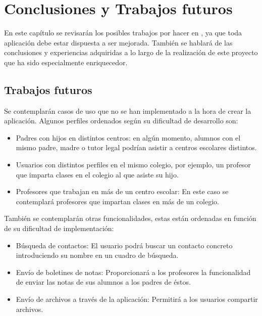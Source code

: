 %
%
%
%

\cleardoublepage
\chapter{Conclusiones y Trabajos futuros}
\label{chap:conclusions}

	En este capítulo se revisarán los posibles trabajos por hacer en \CollegeApp, ya que toda aplicación debe estar dispuesta a ser mejorada. También se hablará de las conclusiones y experiencias adquiridas a lo largo de la realización de este proyecto que ha sido especialmente enriquecedor.

	\section{Trabajos futuros}
	
		Se contemplarán casos de uso que no se han implementado a la hora de crear la aplicación. Algunos perfiles ordenados según su dificultad de desarrollo son:
		
		\begin{itemize}
			\item Padres con hijos en distintos centros: en algún momento, alumnos con el mismo padre, madre o tutor legal podrían asistir a centros escolares distintos.
			\item Usuarios con distintos perfiles en el mismo colegio, por ejemplo, un profesor que imparta clases en el colegio al que asiste su hijo.
			\item Profesores que trabajan en más de un centro escolar: En este caso se contemplará profesores que impartan clases en más de un colegio.
		\end{itemize}
		
		También se contemplarán otras funcionalidades, estas están ordenadas en función de su dificultad de implementación:
		\begin{itemize}
			\item Búsqueda de contactos: El usuario podrá buscar un contacto concreto introduciendo su nombre en un cuadro de búsqueda.
			\item Envío de boletines de notas: Proporcionará a los profesores la funcionalidad de enviar las notas de sus alumnos a los padres de éstos.
			\item Envío de archivos a través de la aplicación: Permitirá a los usuarios compartir archivos.
		\end{itemize}
		
